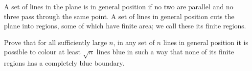 A set of lines in the plane is in general position if no two are parallel and no three pass through the same point.
A set of lines in general position cuts the plane into regions, some of which have finite area; we call these its finite regions.

Prove that for all sufficiently large $n$,  in any set of $n$ lines in general position it is possible to colour at least $\sqrt{n}$ lines blue in such a way that none of its finite regions has a completely blue boundary.

